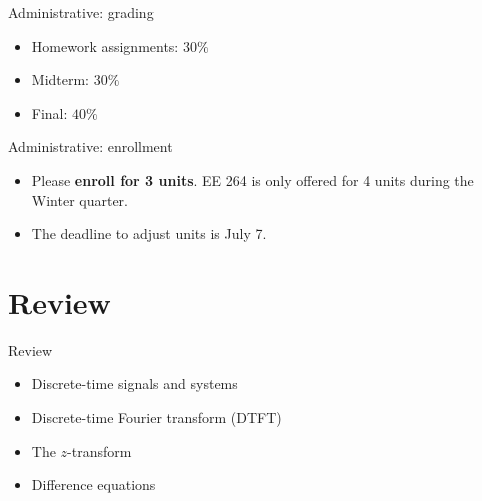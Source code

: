 \documentclass[10pt, handout]{beamer}
\begin{document}
%
\begin{frame}{Administrative: grading}
	
	\begin{itemize}
		\item Homework assignments: $30\%$
		\item Midterm: $30\%$
		\item Final: $40\%$
	\end{itemize}
	
\end{frame}

%
\begin{frame}{Administrative: enrollment}
	
\begin{itemize}
	\item Please \textbf{enroll for 3 units}. EE 264 is only offered for 4 units during the Winter quarter.
	\item The deadline to adjust units is July 7.
\end{itemize}
	
\end{frame}

\section{Review}

%
\begin{frame}{Review}
	\begin{itemize}
		\item Discrete-time signals and systems
		\item Discrete-time Fourier transform (DTFT)
		\item The $z$-transform
		\item Difference equations
	\end{itemize}
\end{frame}
\end{document}
